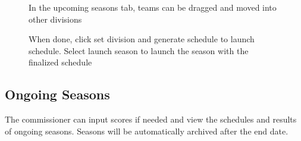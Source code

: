 \documentclass{article}
\begin{document}
\begin{figure}[H]
    \centering
    \caption{In the upcoming seasons tab, teams can be dragged and moved into other divisions}
\end{figure}

\begin{figure}[H]
    \centering
    \caption{When done, click set division and generate schedule to launch schedule. Select launch season to launch the season with the finalized schedule}
\end{figure}

\subsection{Ongoing Seasons}
The commissioner can input scores if needed and view the schedules and results of ongoing seasons. Seasons will be automatically archived after the end date.
\end{document}
